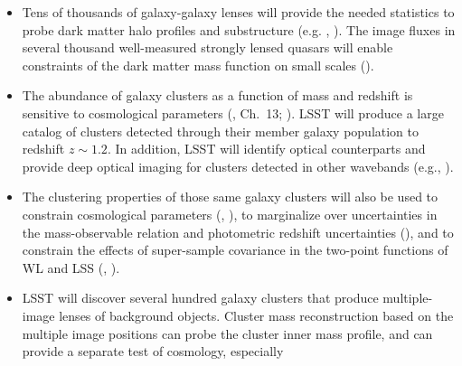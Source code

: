 \begin{itemize}
\item Tens of thousands of galaxy-galaxy lenses will provide the needed statistics to probe dark matter
halo profiles and substructure (e.g. \cite{2006MNRAS.368..715M}, \cite{2012Natur.481..341V}). The image fluxes in several thousand well-measured
strongly lensed quasars will enable constraints of the dark matter mass function on small scales (\cite{2002ApJ...572...25D}).
\item The abundance of galaxy clusters as a function of mass and redshift is sensitive to cosmological parameters
(\cite{2009arXiv0912.0201L}, Ch.~13; \cite{2014MNRAS.443.1973V}). LSST will produce a large catalog of clusters detected through their member galaxy population
to redshift $z\sim 1.2$.  In addition, LSST will identify optical counterparts and provide deep optical
imaging for clusters detected in other wavebands (e.g., \cite{2009ApJ...701...32S}).
\item The clustering properties of those same galaxy clusters will also be used to constrain
  cosmological parameters (\cite{1996MNRAS.282.1096M}, \cite{2013MNRAS.434..684M}), to marginalize over uncertainties in
  the mass-observable relation and photometric redshift uncertainties (\cite{2011PhRvD..83b3008O}), and to constrain the effects of super-sample covariance in the two-point functions of WL and LSS (\cite{2003ApJ...584..702H}, \cite{2014MNRAS.441.2456T}).
\item LSST will discover several hundred galaxy clusters that produce multiple-image lenses of background objects.
Cluster mass reconstruction based on the multiple image positions
 can probe the cluster inner mass profile, and can provide a separate test of cosmology, especially

\end{itemize}

